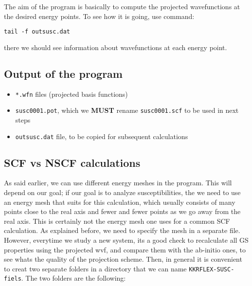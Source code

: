 \documentclass[11pt,fleqn]{book} %
\begin{document}
The aim of the program is basically to compute the projected wavefunctions at the
desired energy points. To see how it is going, use command:
\begin{VBox}
\begin{verbatim}
tail -f outsusc.dat
\end{verbatim}
\end{VBox}
there we should see information about wavefunctions at each energy point.


\subsection{Output of the program}

\begin{itemize}

\item \verb|*.wfn| files (projected basis functions)

\item \verb|susc0001.pot|, which we \textbf{MUST} rename  \verb|susc0001.scf| to be used in next steps

\item \verb|outsusc.dat| file, to be copied for subsequent calculations

\end{itemize}

\subsection{SCF vs NSCF calculations}
\label{subsec:kkrflexsusc-scf-nscf}

As said earlier, we can use different energy meshes in the program.
This will depend on our goal; if our goal is to analyze susceptibilities,
the we need to use an energy mesh that suits for this calculation,
which usually consists of many points close to the real axis and fewer and fewer
points as we go away from the real axis. This is certainly not the
energy mesh one uses for a common SCF calculation. As explained before, we
need to specify the mesh in a separate file. However, everytime we study a new system,
its a good check to recalculate all GS properties using the projected wvf, and
compare them with the ab-initio ones, to see whats the quality of the projection scheme.
Then, in general it is convenient to creat two separate folders
in a directory that we can name \verb|KKRFLEX-SUSC-fiels|. The two folders
are the following:
\end{document}
